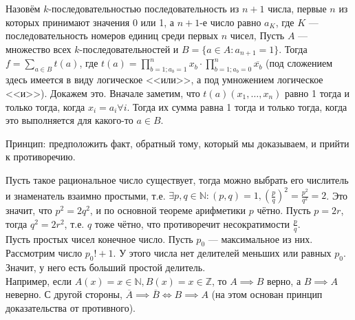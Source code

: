\documentclass[12pt,a4paper]{article}
\begin{document}
\z Назовём $k$-последовательностью последовательность из $n+1$ числа, первые $n$ из которых принимают значения 0 или 1, а $n+1$-е число равно $a_K$, где $K$ --- последовательность номеров единиц среди первых $n$ чисел, Пусть $A$ --- множество всех $k$-последовательностей и $B=\{a\in A:a_{n+1}=1\}$. Тогда $f=\sum_{a\in B}t(a)$, где $t(a)=\prod_{b=1;a_b=1}^n x_b\cdot \prod_{b=1;a_b=0}^n \overline{x_b}$ (под сложением здесь имеется в виду логическое <<или>>, а под умножением логическое <<и>>). Докажем это. Вначале заметим, что $t(a)(x_1,\ldots ,x_n)$ равно 1 тогда и только тогда, когда $x_i=a_i\forall i$. Тогда их сумма равна 1 тогда и только тогда, когда это выполняется для какого-то $a\in B$.\QEDA\\

\newpage

\z Принцип: предположить факт, обратный тому, который мы доказываем, и прийти к противоречию.

\p Пусть такое рациональное число существует, тогда можно выбрать его числитель и знаменатель взаимно простыми, т.е. $\exists p,q\in \mathbb N:(p,q)=1,(\frac{p}{q})^2=\frac{p^2}{q^2}=2$. Это значит, что $p^2=2q^2$, и по основной теореме арифметики $p$ чётно. Пусть $p=2r$, тогда $q^2=2r^2$, т.е. $q$ тоже чётно, что противоречит несократимости $\frac{p}{q}$.\QEDA\\

\p Пусть простых чисел конечное число. Пусть $p_0$ --- максимальное из них. Рассмотрим число $p_0!+1$. У этого числа нет делителей меньших или равных $p_0$. Значит, у него есть больший простой делитель.\QEDA\\

\z Например, если $A(x)=x\in \mathbb N,B(x)=x\in \mathbb Z$, то $A\implies B$ верно, а $B\implies A$ неверно. С другой стороны, $\overline{A}\implies \overline{B}\iff B\implies A$ (на этом основан принцип доказательства от противного).\QEDA\\
\end{document}
